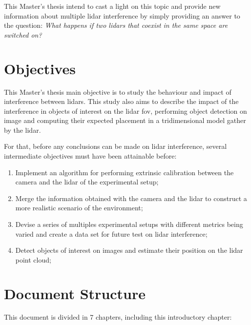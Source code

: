 This Master's thesis intend to cast a light on this topic and provide new information about multiple \ac{lidar} interference by simply providing an answer to the question: \textit{What happens if two \acp{lidar} that coexist in the same space are switched on?} 


\section{Objectives}
\label{sec:introduction:objectives}
This Master's thesis main objective is to study the behaviour and impact of interference between \acp{lidar}. This study also aims to describe the impact of the interference in objects of interest on the \ac{lidar} \acl{fov}, performing object detection on image and computing their expected placement in a tridimensional model gather by the \ac{lidar}.

For that, before any conclusions can be made on \ac{lidar} interference, several intermediate objectives must have been attainable before:
\begin{enumerate}
	\item Implement an algorithm for performing extrinsic calibration between the camera and the \ac{lidar} of the experimental setup;
	\item Merge the information obtained with the camera and the \ac{lidar} to construct a more realistic scenario of the environment;
	\item Devise a series of multiples experimental setups with different metrics being varied and create a data set for future test on \ac{lidar} interference;
	\item Detect objects of interest on images and estimate their position on the	\ac{lidar} point cloud;
\end{enumerate}


\section{Document Structure} \label{sec:introduction:structure}
This document is divided in 7 chapters, including this introductory chapter:

